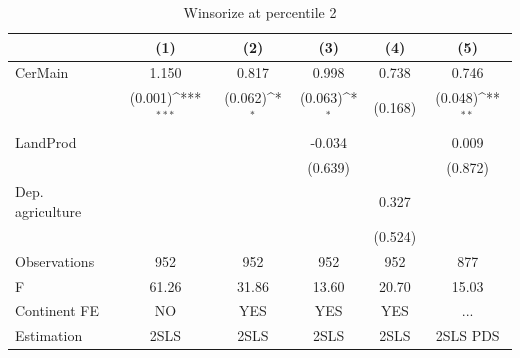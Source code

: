 \begin{table}[htbp]\centering
\def\sym#1{\ifmmode^{#1}\else\(^{#1}\)\fi}
\caption{Winsorize at percentile 2}
\begin{tabular}{l*{5}{c}}
\hline\hline
                &\multicolumn{1}{c}{(1)}         &\multicolumn{1}{c}{(2)}         &\multicolumn{1}{c}{(3)}         &\multicolumn{1}{c}{(4)}         &\multicolumn{1}{c}{(5)}         \\
\hline
CerMain         &    1.150         &    0.817         &    0.998         &    0.738         &    0.746         \\
                &  (0.001)\sym{***}&  (0.062)\sym{*}  &  (0.063)\sym{*}  &  (0.168)         &  (0.048)\sym{**} \\
LandProd        &                  &                  &   -0.034         &                  &    0.009         \\
                &                  &                  &  (0.639)         &                  &  (0.872)         \\
Dep. agriculture&                  &                  &                  &    0.327         &                  \\
                &                  &                  &                  &  (0.524)         &                  \\
\hline
Observations    &      952         &      952         &      952         &      952         &      877         \\
F               &    61.26         &    31.86         &    13.60         &    20.70         &    15.03         \\
Continent FE    &       NO         &      YES         &      YES         &      YES         &      ...         \\
Estimation      &     2SLS         &     2SLS         &     2SLS         &     2SLS         & 2SLS PDS         \\
\hline\hline
\end{tabular}
\end{table}
